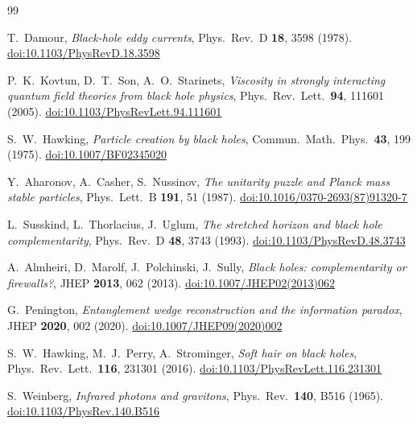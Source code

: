 \documentclass[11pt,a4paper]{article}
\begin{document}
\clearpage
\sloppy\raggedright
\begin{thebibliography}{99}

  T.~Damour,
  \textit{Black-hole eddy currents},
  Phys.\ Rev.\ D \textbf{18}, 3598 (1978).
  \href{https://doi.org/10.1103/PhysRevD.18.3598}{doi:10.1103/PhysRevD.18.3598}

  P.~K.~Kovtun, D.~T.~Son, A.~O.~Starinets,
  \textit{Viscosity in strongly interacting quantum field theories from black hole physics},
  Phys.\ Rev.\ Lett.\ \textbf{94}, 111601 (2005).
  \href{https://doi.org/10.1103/PhysRevLett.94.111601}{doi:10.1103/PhysRevLett.94.111601}

  S.~W.~Hawking,
  \textit{Particle creation by black holes},
  Commun.\ Math.\ Phys.\ \textbf{43}, 199 (1975).
  \href{https://doi.org/10.1007/BF02345020}{doi:10.1007/BF02345020}

  Y.~Aharonov, A.~Casher, S.~Nussinov,
  \textit{The unitarity puzzle and Planck mass stable particles},
  Phys.\ Lett.\ B \textbf{191}, 51 (1987).
  \href{https://doi.org/10.1016/0370-2693(87)91320-7}{doi:10.1016/0370-2693(87)91320-7}

  L.~Susskind, L.~Thorlacius, J.~Uglum,
  \textit{The stretched horizon and black hole complementarity},
  Phys.\ Rev.\ D \textbf{48}, 3743 (1993).
  \href{https://doi.org/10.1103/PhysRevD.48.3743}{doi:10.1103/PhysRevD.48.3743}

  A.~Almheiri, D.~Marolf, J.~Polchinski, J.~Sully,
  \textit{Black holes: complementarity or firewalls?},
  JHEP \textbf{2013}, 062 (2013).
  \href{https://doi.org/10.1007/JHEP02(2013)062}{doi:10.1007/JHEP02(2013)062}

  G.~Penington,
  \textit{Entanglement wedge reconstruction and the information paradox},
  JHEP \textbf{2020}, 002 (2020).
  \href{https://doi.org/10.1007/JHEP09(2020)002}{doi:10.1007/JHEP09(2020)002}

  S.~W.~Hawking, M.~J.~Perry, A.~Strominger,
  \textit{Soft hair on black holes},
  Phys.\ Rev.\ Lett.\ \textbf{116}, 231301 (2016).
  \href{https://doi.org/10.1103/PhysRevLett.116.231301}{doi:10.1103/PhysRevLett.116.231301}

  S.~Weinberg,
  \textit{Infrared photons and gravitons},
  Phys.\ Rev.\ \textbf{140}, B516 (1965).
  \href{https://doi.org/10.1103/PhysRev.140.B516}{doi:10.1103/PhysRev.140.B516}


\end{thebibliography}
\end{document}
